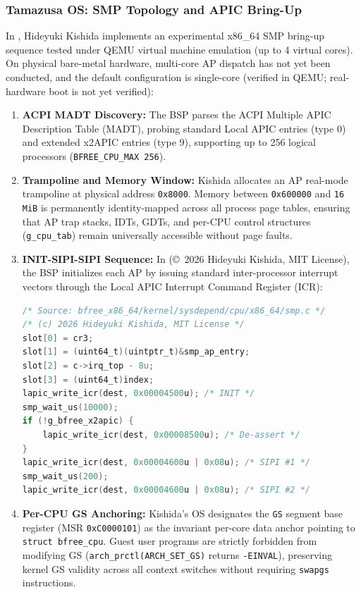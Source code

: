 \documentclass[10pt,journal,compsoc,twocolumn]{article}
\begin{document}
\subsubsection{Tamazusa OS: SMP Topology and APIC Bring-Up}
In , Hideyuki Kishida implements an experimental x86\_64 SMP bring-up sequence tested under QEMU virtual machine emulation (up to 4 virtual cores). On physical bare-metal hardware, multi-core AP dispatch has not yet been conducted, and the default configuration is single-core (verified in QEMU; real-hardware boot is not yet verified):
\begin{enumerate}[leftmargin=*]
    \item \textbf{ACPI MADT Discovery:} The BSP parses the ACPI Multiple APIC Description Table (MADT), probing standard Local APIC entries (type 0) and extended x2APIC entries (type 9), supporting up to 256 logical processors (\texttt{BFREE\_CPU\_MAX 256}).
    \item \textbf{Trampoline and Memory Window:} Kishida allocates an AP real-mode trampoline at physical address \texttt{0x8000}. Memory between \texttt{0x600000} and \texttt{16 MiB} is permanently identity-mapped across all process page tables, ensuring that AP trap stacks, IDTs, GDTs, and per-CPU control structures (\texttt{g\_cpu\_tab}) remain universally accessible without page faults.
    \item \textbf{INIT-SIPI-SIPI Sequence:} In  (\copyright~2026 Hideyuki Kishida, MIT License), the BSP initializes each AP by issuing standard inter-processor interrupt vectors through the Local APIC Interrupt Command Register (ICR):
    \begin{lstlisting}[language=C,caption={AP INIT-SIPI-SIPI sequence in \texttt{bfree\_x86\_64/kernel/sysdepend/cpu/x86\_64/smp.c}. Quoted excerpts of Tamazusa OS code are \copyright~2026 Hideyuki Kishida, licensed under the MIT License; third-party components keep their own licenses.}]
/* Source: bfree_x86_64/kernel/sysdepend/cpu/x86_64/smp.c */
/* (c) 2026 Hideyuki Kishida, MIT License */
slot[0] = cr3;
slot[1] = (uint64_t)(uintptr_t)&smp_ap_entry;
slot[2] = c->irq_top - 8u;
slot[3] = (uint64_t)index;
lapic_write_icr(dest, 0x00004500u); /* INIT */
smp_wait_us(10000);
if (!g_bfree_x2apic) {
    lapic_write_icr(dest, 0x00008500u); /* De-assert */
}
lapic_write_icr(dest, 0x00004600u | 0x08u); /* SIPI #1 */
smp_wait_us(200);
lapic_write_icr(dest, 0x00004600u | 0x08u); /* SIPI #2 */
    \end{lstlisting}
    \item \textbf{Per-CPU GS Anchoring:} Kishida's OS designates the \texttt{GS} segment base register (MSR \texttt{0xC0000101}) as the invariant per-core data anchor pointing to \texttt{struct bfree\_cpu}. Guest user programs are strictly forbidden from modifying GS (\texttt{arch\_prctl(ARCH\_SET\_GS)} returns \texttt{-EINVAL}), preserving kernel GS validity across all context switches without requiring \texttt{swapgs} instructions.
\end{enumerate}
\end{document}

